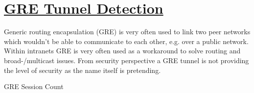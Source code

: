 %
%
%

\chapter[GRE Tunnel Detection]{\underline{GRE Tunnel Detection}}
\begin{flushleft}
%
Generic routing encapsulation (GRE) is very often used to link two peer networks which wouldn’t be able to communicate to each other, e.g. over a public network. Within intranets GRE is very often used as a workaround to solve routing and broad-/multicast issues. From security perspective a GRE tunnel is not providing the level of security as the name itself is pretending.
\end{flushleft}
%
\begin{table}[H]
\begin{center}
  \caption[\normalsize{GRE Session Count}]{\small{GRE Session Count}}
\end{center}
\end{table}
